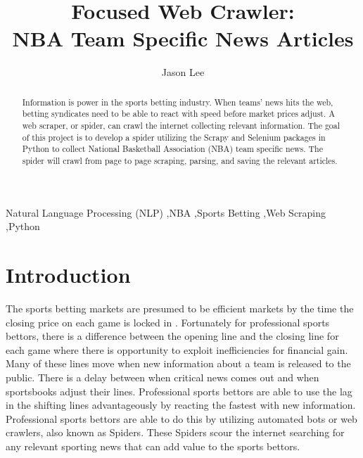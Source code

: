 \documentclass[5p,authoryear]{elsarticle}
\begin{document}
\begin{frontmatter}

\title{Focused Web Crawler: \\NBA Team Specific News Articles}
\author{Jason Lee}
\address{Northwestern University, SPS \\Natural Language Processing \\2020SP MSDS 453-56}


\begin{abstract}

Information is power in the sports betting industry. When teams' news hits the web, betting syndicates need to be able to react with speed before market prices adjust. A web scraper, or spider, can crawl the internet collecting relevant information. The goal of this project is to develop a spider utilizing the Scrapy and Selenium packages in Python to collect National Basketball Association (NBA) team specific news. The spider will crawl from page to page scraping, parsing, and saving the relevant articles.

\end{abstract}



\begin{keyword}
Natural Language Processing (NLP) \sep NBA \sep Sports Betting \sep Web Scraping \sep Python \end{keyword}

\end{frontmatter}



\section{Introduction}\label{introduction}

The sports betting markets are presumed to be efficient markets by the time the closing price on each game is locked in \citep{market}. Fortunately for professional sports bettors, there is a difference between the opening line and the closing line for each game where there is opportunity to exploit inefficiencies for financial gain. Many of these lines move when new information about a team is released to the public. There is a delay between when critical news comes out and when sportsbooks adjust their lines. Professional sports bettors are able to use the lag in the shifting lines advantageously by reacting the fastest with new information. Professional sports bettors are able to do this by utilizing automated bots or web crawlers, also known as Spiders. These Spiders scour the internet searching for any relevant sporting news that can add value to the sports bettors. 
\end{document}
